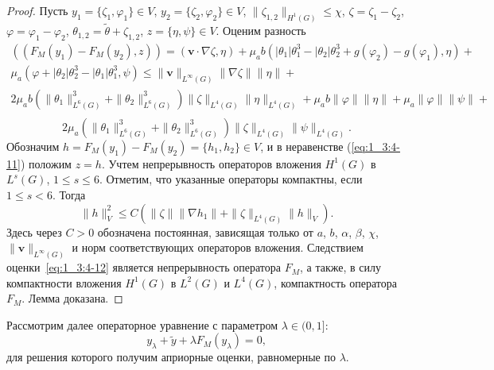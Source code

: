 \begin{proof}
    Пусть $y_1=\{\zeta_1, \varphi_1\}
    \in V$, $y_2=\{\zeta_2, \varphi_2\} \in V$,
    $\|\zeta_{1,2}\|_{H^1(G)} \leq \chi$, $\zeta = \zeta_1 - \zeta_2$,
    $\varphi = \varphi_1 - \varphi_2$, $\theta_{1,2} =
    \widetilde{\theta} + \zeta_{1,2}$, $z = \{\eta, \psi\} \in V$.
    Оценим разность
    \begin{gather*}
        ((F_M(y_1)-F_M(y_2), z)) = (\textbf{v}\cdot\nabla\zeta, \eta) +
        \mu_a
        b(|\theta_1|\theta_1^3-|\theta_2|\theta_2^3+g(\varphi_2)-g(\varphi_1),
        \eta)+\\
        \mu_a(\varphi+|\theta_2|\theta_2^3-|\theta_1|\theta_1^3, \psi)
        \leq \|\textbf{v}\|_{L^{\infty}(G)} \|\nabla\zeta\| \|\eta\| +\\
        2\mu_a b\left(\|\theta_1\|^3_{L^6(G)} +
        \|\theta_2\|^3_{L^6(G)}\right) \|\zeta\|_{L^4(G)}
        \|\eta\|_{L^4(G)} + \mu_a
        b\|\varphi\|\|\eta\|+\mu_a\|\varphi\|\|\psi\|+\\
    \end{gather*}
    \begin{equation}
        \label{eq:1_3:4-11}
        2\mu_a
        \left(\|\theta_1\|^3_{L^6(G)}
        + \|\theta_2\|^3_{L^6(G)}\right)\|\zeta\|_{L^4(G)}\|\psi\|_{L^4(G)}.
    \end{equation}
    Обозначим $h=F_M(y_1)-F_M(y_2)=\{h_1, h_2\} \in V$, и в
    неравенстве (\ref{eq:1_3:4-11}) положим $z=h$.
    Учтем непрерывность
    операторов вложения $H^1(G)$ в $L^s(G)$, $1 \leq s \leq 6$.
    Отметим, что указанные операторы компактны, если $1 \leq s < 6$.
    Тогда
    \begin{equation}
        \label{eq:1_3:4-12}
        \|h\|^2_V \leq C \left( \|\zeta\|\|\nabla h_1\| +
        \|\zeta\|_{L^4(G)}\|h\|_V\right).
    \end{equation}
    Здесь через $C>0$ обозначена постоянная, зависящая только от $a$,
    $b$, $\alpha$, $\beta$, $\chi$, $\|\textbf{v}\|_{L^{\infty}(G)}$ и
    норм соответствующих операторов вложения.
    Следствием оценки~\eqref{eq:1_3:4-12} является
    непрерывность оператора $F_M$, а также, в
    силу компактности вложения $H^1(G)$ в $L^2(G)$ и $L^4(G)$,
    компактность оператора $F_M$.
    Лемма доказана.
\end{proof}

Рассмотрим далее операторное уравнение с параметром
$\lambda \in (0,1]$:
\begin{equation}
    \label{eq:1_3:4-13}
    y_{\lambda} + \widetilde{y} + \lambda F_M(y_{\lambda}) = 0,
\end{equation}
для решения которого получим априорные оценки, равномерные по $\lambda$.

